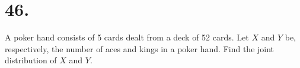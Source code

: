 \section*{46.}
A poker hand consists of 5 cards dealt from a deck of 52 cards. Let $X$ and
$Y$ be, respectively, the number of aces and kings in a poker hand. Find the
joint distribution of $X$ and $Y$.

\bigskip
\noindent

